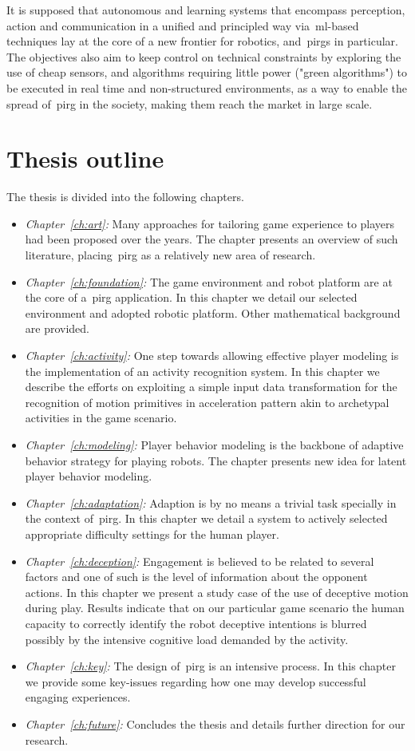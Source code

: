 It is supposed that autonomous and learning systems that encompass perception, action and communication in a unified and principled way via~\gls{ml}-based techniques lay at the core of a new frontier for robotics, and~\gls{pirg}s in particular. The objectives also aim to keep control on technical constraints by exploring the use of cheap sensors, and algorithms requiring little power ("green algorithms") to be executed in real time and non-structured environments, as a way to enable the spread of~\gls{pirg} in the society, making them reach the market in large scale.

\section{Thesis outline}
The thesis is divided into the following chapters.

\begin{itemize}
\item\emph{Chapter~\ref{ch:art}:} Many approaches for tailoring game experience to players had been proposed over the years. The chapter presents an overview of such literature, placing~\gls{pirg} as a relatively new area of research.
\item\emph{Chapter~\ref{ch:foundation}:} The game environment and robot platform are at the core of a~\gls{pirg} application. In this chapter we detail our selected environment and adopted robotic platform. Other mathematical background are provided.
\item\emph{Chapter~\ref{ch:activity}:} One step towards allowing effective player modeling is the implementation of an activity recognition system. In this chapter we describe the efforts on exploiting a simple input data transformation for the recognition of motion primitives in acceleration pattern akin to archetypal activities in the game scenario.
\item\emph{Chapter~\ref{ch:modeling}:} Player behavior modeling is the backbone of adaptive behavior strategy for playing robots. The chapter presents new idea for latent player behavior modeling.
\item\emph{Chapter~\ref{ch:adaptation}:} Adaption is by no means a trivial task specially in the context of~\gls{pirg}. In this chapter we detail a system to actively selected appropriate difficulty settings for the human player.
\item\emph{Chapter~\ref{ch:deception}:} Engagement is believed to be related to several factors and one of such is the level of information about the opponent actions. In this chapter we present a study case of the use of deceptive motion during play. Results indicate that on our particular game scenario the human capacity to correctly identify the robot deceptive intentions is blurred possibly by the intensive cognitive load demanded by the activity.
\item\emph{Chapter~\ref{ch:key}:} The design of~\gls{pirg} is an intensive process. In this chapter we provide some key-issues regarding how one may develop successful engaging experiences.
\item\emph{Chapter~\ref{ch:future}:} Concludes the thesis and details further direction for our research.
\end{itemize}

